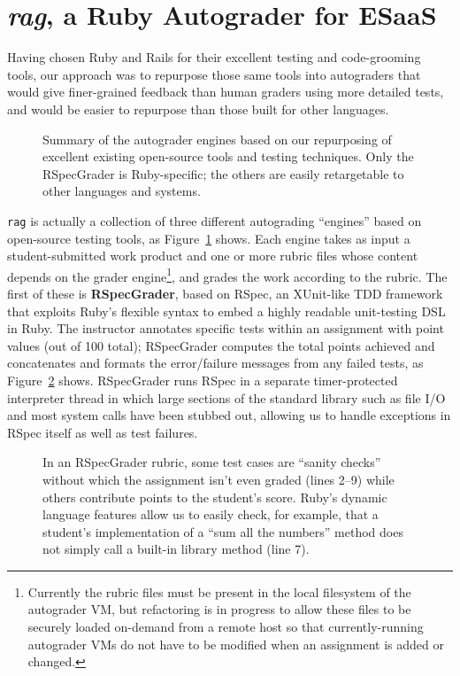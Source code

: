 \section{\emph{rag}, a Ruby Autograder for ESaaS}

Having chosen Ruby and Rails for their excellent testing and
code-grooming tools, our approach was to repurpose those same tools into
autograders that would give finer-grained feedback than human graders
using more detailed tests, and would be easier to repurpose than
those built for other languages.

\begin{figure}
  
  \caption{\label{fig:grader_summary} Summary of the autograder
    engines based on our repurposing of excellent existing open-source
    tools and testing techniques.  Only the RSpecGrader is
    Ruby-specific; the others are easily retargetable to other languages
    and systems.}
\end{figure}

\texttt{rag} 
is actually a collection of three different autograding
``engines'' based on open-source testing
tools, as Figure~\ref{fig:grader_summary} shows.  
Each engine takes as input a student-submitted work
product and one or more rubric files whose content depends on the grader
engine\footnote{Currently the rubric files must be present in the
  local filesystem of the autograder VM, but refactoring is in progress
  to allow these files to be securely loaded on-demand from a remote
  host so that currently-running 
  autograder VMs do not have to be modified when an assignment is added
  or changed.}, and grades the work according to
the rubric.  
The first of these is
\textbf{RSpecGrader}, based on RSpec, an XUnit-like 
TDD framework that exploits Ruby's
flexible syntax to embed a highly readable unit-testing DSL in Ruby.
The instructor annotates specific tests within an assignment with point
values (out of 100 total); RSpecGrader computes the total points
achieved and concatenates and formats the error/failure messages from
any failed tests, as Figure~\ref{fig:rspec_grader_rubric} shows.
RSpecGrader  runs RSpec in a separate timer-protected interpreter
thread in which large sections of the
standard library such as file I/O and most system calls have been
stubbed out, allowing us to handle exceptions in RSpec itself as well
as test failures.  

\begin{figure}
  \centering
    
  \caption{\label{fig:rspec_grader_rubric}
    In an RSpecGrader rubric, some test cases are ``sanity checks''
    without which the assignment isn't even graded
    (lines 2--9) while others contribute points to the
    student's score.  Ruby's dynamic language features allow us to
    easily check, for example, that
a student's implementation of a ``sum all the numbers'' method does not
simply call a built-in library method (line 7).
  }
\end{figure}

